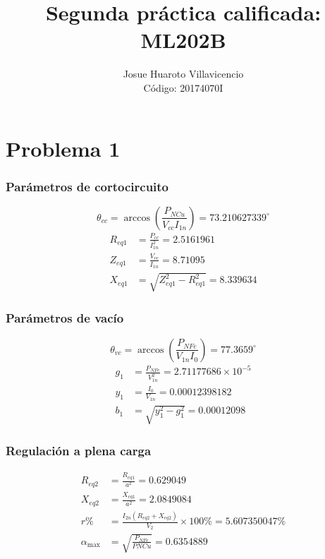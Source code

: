 \documentclass[a4paper,11pt]{article}
\title{Segunda práctica calificada: ML202B}
\author{Josue Huaroto Villavicencio\\
Código: 20174070I}
\begin{document}
\maketitle
\section*{Problema 1}
\subsubsection*{Parámetros de cortocircuito}
$$
\theta_{cc} = \arccos\left (\frac{P_{NCu}}{V_{cc}I_{1n}} \right) = 73.210627339^{\circ}
$$
\begin{align*}
R_{eq1} &= \frac{P_{cc}}{I_{1n}^{2}} = 2.5161961\\
Z_{eq1} &= \frac{V_{cc}}{I_{1n}} = 8.71095\\
X_{eq1} &= \sqrt{Z_{eq1}^{2} - R_{eq1}^{2}} = 8.339634
\end{align*}
\subsubsection*{Parámetros de vacío}
$$
\theta_{vc} = \arccos\left (\frac{P_{NFe}}{V_{1n}I_{0}} \right) = 77.3659^{\circ}
$$
\begin{align*}
    g_{1} &= \frac{P_{NFe}}{V_{1n}^{2}} = 2.71177686\times 10^{-5}\\
    y_{1} &= \frac{I_{0}}{V_{1n}} = 0.00012398182\\
    b_{1} &= \sqrt{y_{1}^{2} - g_{1}^{2}} = 0.00012098
\end{align*}
\subsubsection*{Regulación a plena carga}
\begin{align*}
    R_{eq2} &= \frac{R_{eq1}}{a^{2}} = 0.629049\\
    X_{eq2} &= \frac{X_{eq1}}{a^{2}} = 2.0849084\\
    r\% &= \frac{I_{2n}(R_{eq2}+X_{eq2})}{V_{2}} \times 100\% = 5.607350047\%\\
    \alpha_{\max} &= \sqrt{\frac{P_{NFe}}{PNCu}} = 0.6354889
\end{align*}
\end{document}
